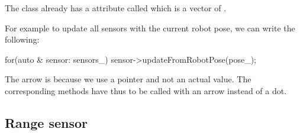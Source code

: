 \documentclass{ecnreport}
\begin{document}
The  class already has a attribute called  which is a vector of .

For example to update all sensors with the current robot pose, we can write the following:
\begin{cppcode}
    for(auto & sensor: sensors_)
	sensor->updateFromRobotPose(pose_);
\end{cppcode}The arrow is because we use a pointer and not an actual value. The corresponding methods have thus to be 
called with an arrow instead of a dot.





\subsection{Range sensor}
\end{document}
